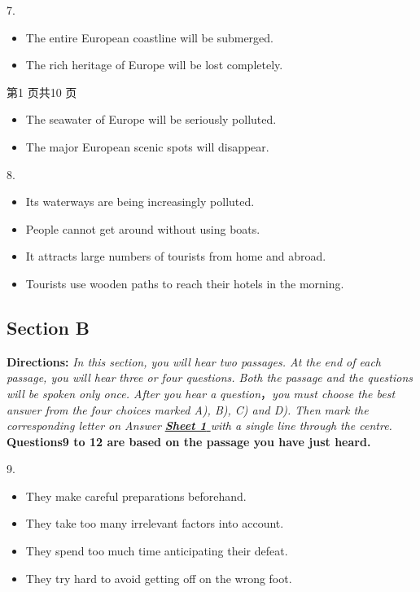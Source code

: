 \documentclass[UTF8,11pt]{ctexart}
\begin{document}
7.


\begin{itemize}[leftmargin=2em,itemsep=.2em,topsep=.4em]\item[A.] The entire European coastline will be submerged.
\item[B.] The rich heritage of Europe will be lost completely.
\end{itemize}

第1 页共10 页


\begin{itemize}[leftmargin=2em,itemsep=.2em,topsep=.4em]\item[C.] The seawater of Europe will be seriously polluted.
\item[D.] The major European scenic spots will disappear.
\end{itemize}

8.


\begin{itemize}[leftmargin=2em,itemsep=.2em,topsep=.4em]\item[A.] Its waterways are being increasingly polluted.
\item[B.] People cannot get around without using boats.
\item[C.] It attracts large numbers of tourists from home and abroad.
\item[D.] Tourists use wooden paths to reach their hotels in the morning.
\end{itemize}

\subsection*{\textbf{Section B}}


\textbf{Directions:}\textit{ In this section, you will hear two passages. At the end of each passage, you will hear} \textit{three or four questions. Both the passage and the questions will be spoken only once. After you hear a} \textit{question}，\textit{you must choose the best answer from the four choices marked A), B), C) and D). Then} \textit{mark the corresponding letter on Answer}\textbf{\textit{ }}\textbf{\textit{\uline{Sheet 1}}}\textit{\uline{ }}\textit{with a single line through the centre.} \textbf{Questions9 to 12 are based on the passage you have just heard.}


9.


\begin{itemize}[leftmargin=2em,itemsep=.2em,topsep=.4em]\item[A.] They make careful preparations beforehand.
\item[B.] They take too many irrelevant factors into account.
\item[C.] They spend too much time anticipating their defeat.
\item[D.] They try hard to avoid getting off on the wrong foot.
\end{itemize}
\end{document}
